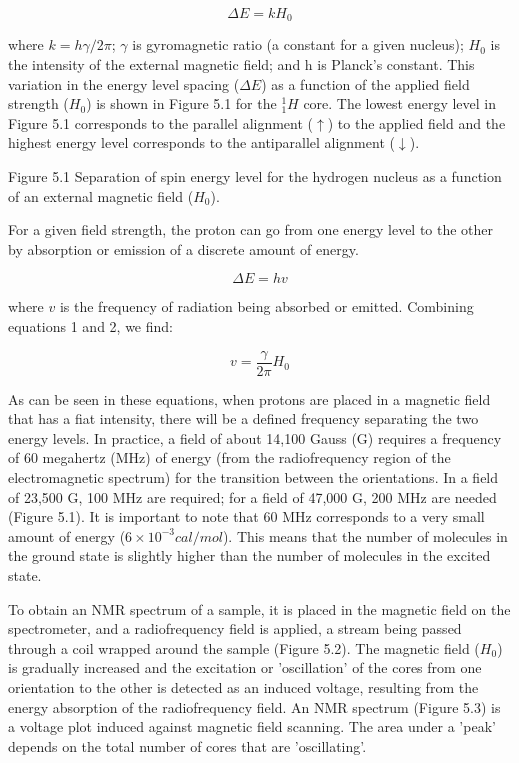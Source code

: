 \begin{equation}
\Delta E = k H_0
\end{equation}

where $k = h\gamma/2\pi$; $\gamma$ is gyromagnetic ratio (a constant for a given nucleus); $H_0$ is the intensity of the external magnetic field; and h is Planck's constant. This variation in the energy level spacing ($\Delta E$) as a function of the applied field strength ($H_0$) is shown in Figure 5.1 for the $^1_1H$ core. The lowest energy level in Figure 5.1 corresponds to the parallel alignment ($\uparrow$) to the applied field and the highest energy level corresponds to the antiparallel alignment ($\downarrow$).

Figure 5.1 Separation of spin energy level for the hydrogen nucleus as a function of an external magnetic field ($H_0$).

For a given field strength, the proton can go from one energy level to the other by absorption or emission of a discrete amount of energy.

\begin{equation}
\Delta E = hv
\end{equation}

where $v$ is the frequency of radiation being absorbed or emitted. Combining equations 1 and 2, we find:

\begin{equation}
v = \frac{\gamma}{2\pi} H_0
\end{equation}

As can be seen in these equations, when protons are placed in a magnetic field that has a fiat intensity, there will be a defined frequency separating the two energy levels. In practice, a field of about 14,100 Gauss (G) requires a frequency of 60 megahertz (MHz) of energy (from the radiofrequency region of the electromagnetic spectrum) for the transition between the orientations. In a field of 23,500 G, 100 MHz are required; for a field of 47,000 G, 200 MHz are needed (Figure 5.1). It is important to note that 60 MHz corresponds to a very small amount of energy ($6\times10^{-3} cal/mol$). This means that the number of molecules in the ground state is slightly higher than the number of molecules in the excited state.

To obtain an NMR spectrum of a sample, it is placed in the magnetic field on the spectrometer, and a radiofrequency field is applied, a stream being passed through a coil wrapped around the sample (Figure 5.2). The magnetic field ($H_0$) is gradually increased and the excitation or 'oscillation' of the cores from one orientation to the other is detected as an induced voltage, resulting from the energy absorption of the radiofrequency field. An NMR spectrum (Figure 5.3) is a voltage plot induced against magnetic field scanning. The area under a 'peak' depends on the total number of cores that are 'oscillating'.


